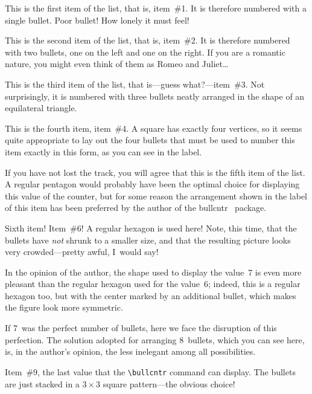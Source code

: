\documentclass[a4paper]{article}
\DeclareRobustCommand*{\packlass}[1]{%
	{\texorpdfstring{\normalfont \sffamily}{}#1}%
}
\newcommand*{\Bullcntr}{bullcntr}
\newcommand*{\bull}{\packlass{\Bullcntr}}
\newcommand*{\tbull}{the \bull\ package}
\begin{document}
\begin{bullenum}
	\renewcommand*{\counterlargebullet}{\textbullet}
	\renewcommand*{\countersmallbullet}{\textbullet}

	\item
		This is the first item of the list, that is, item~\#1.  It is
		therefore numbered with a single bullet.  Poor bullet!  How
		lonely it must feel!

	\item\label{Big-2}
		This is the second item of the list, that is, item~\#2.  It is
		therefore numbered with two bullets, one on the left and one
		on the right.  If you are a romantic nature, you might even
		think of them as Romeo and Juliet\ldots

	\item\label{Big-3}
		This is the third item of the list, that is---guess
		what?---item~\#3.  Not surprisingly, it is numbered with three
		bullets neatly arranged in the shape of an equilateral
		triangle.

	\item
		This is the fourth item, item~\#4.  A square has exactly four
		vertices, so it seems quite appropriate to lay out the four
		bullets that must be used to number this item exactly in this
		form, as you can see in the label.

	\item
		If you have not lost the track, you will agree that this is
		the fifth item of the list.  A regular pentagon would probably
		have been the optimal choice for displaying this value of the
		counter, but for some reason the arrangement shown in the
		label of this item has been preferred by the author of \tbull.

	\item\label{Big-6}
		Sixth item!  Item~\#6!  A regular hexagon is used here!  Note,
		this time, that the bullets have \emph{not} shrunk to a
		smaller size, and that the resulting picture looks very
		crowded---pretty awful, I~would say!

	\item
		In the opinion of the author, the shape used to display the
		value~7 is even more pleasant than the regular hexagon used
		for the value~6; indeed, this is a regular hexagon too, but
		with the center marked by an additional bullet, which makes
		the figure look more symmetric.

	\item
		If 7~was the perfect number of bullets, here we face the
		disruption of this perfection.  The solution adopted for
		arranging 8~bullets, which you can see here, is, in the
		author's opinion, the less inelegant among all possibilities.

	\item\label{Big-9}
		Item~\#9, the last value that the \verb|\bullcntr| command can
		display.  The bullets are just stacked in a $3\times3$ square
		pattern---the obvious choice!
\end{bullenum}
\end{document}
